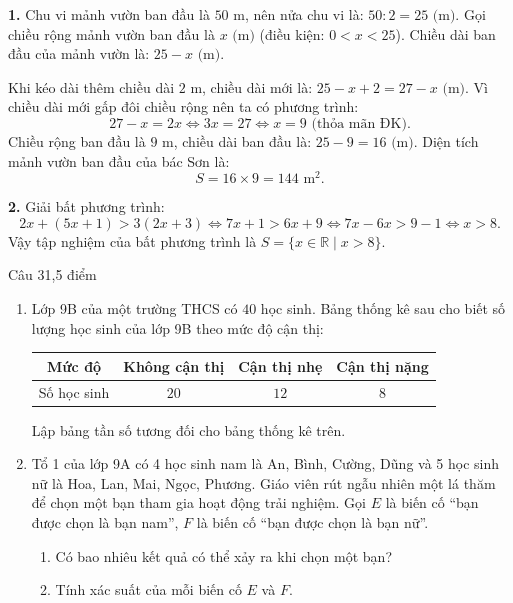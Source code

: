 \begin{loi_giai_cau}
\textbf{1.} Chu vi mảnh vườn ban đầu là $50\text{ m}$, nên nửa chu vi là: $50 : 2 = 25\text{ (m)}$.
Gọi chiều rộng mảnh vườn ban đầu là $x\text{ (m)}$ (điều kiện: $0 < x < 25$).
Chiều dài ban đầu của mảnh vườn là: $25 - x\text{ (m)}$.

Khi kéo dài thêm chiều dài $2\text{ m}$, chiều dài mới là: $25 - x + 2 = 27 - x\text{ (m)}$.
Vì chiều dài mới gấp đôi chiều rộng nên ta có phương trình:
\[27 - x = 2x \iff 3x = 27 \iff x = 9\text{ (thỏa mãn ĐK)}.\]
Chiều rộng ban đầu là $9\text{ m}$, chiều dài ban đầu là: $25 - 9 = 16\text{ (m)}$.
Diện tích mảnh vườn ban đầu của bác Sơn là:
\[S = 16 \times 9 = \boxed{144\text{ m}^2}.\]

\textbf{2.} Giải bất phương trình:
\[2x + (5x+1) > 3(2x+3) \iff 7x + 1 > 6x + 9 \iff 7x - 6x > 9 - 1 \iff \boxed{x > 8}.\]
Vậy tập nghiệm của bất phương trình là $S = \{x \in \mathbb{R} \mid x > 8\}$.
\end{loi_giai_cau}

\begin{de_cau}{Câu 3}{1,5 điểm}
\begin{enumerate}[label=\arabic*.]
\item Lớp 9B của một trường THCS có $40$ học sinh. Bảng thống kê sau cho biết số lượng học sinh của lớp 9B theo mức độ cận thị:
\begin{center}
\begin{tabular}{|c|c|c|c|}
\hline
Mức độ & Không cận thị & Cận thị nhẹ & Cận thị nặng \\ \hline
Số học sinh & $20$ & $12$ & $8$ \\ \hline
\end{tabular}
\end{center}
Lập bảng tần số tương đối cho bảng thống kê trên.
\item Tổ 1 của lớp 9A có 4 học sinh nam là An, Bình, Cường, Dũng và 5 học sinh nữ là Hoa, Lan, Mai, Ngọc, Phương. Giáo viên rút ngẫu nhiên một lá thăm để chọn một bạn tham gia hoạt động trải nghiệm.
Gọi $E$ là biến cố ``bạn được chọn là bạn nam'', $F$ là biến cố ``bạn được chọn là bạn nữ''.
\begin{enumerate}[label=\alph*)]
\item Có bao nhiêu kết quả có thể xảy ra khi chọn một bạn?
\item Tính xác suất của mỗi biến cố $E$ và $F$.
\end{enumerate}
\end{enumerate}
\end{de_cau}

